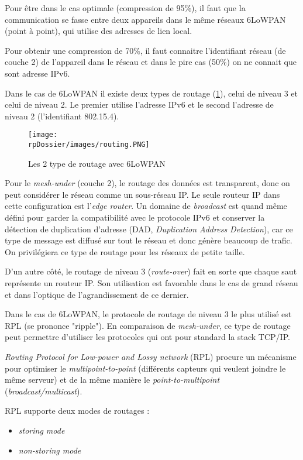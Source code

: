 Pour être dans le cas optimale (compression de 95\%), il faut que la communication se fasse entre deux appareils dans le même réseaux 6LoWPAN (point à point), qui utilise des adresses de lien local.

Pour obtenir une compression de 70\%, il faut connaitre l'identifiant réseau (de couche 2) de l'appareil dans le réseau et dans le pire cas (50\%) on ne connait que sont adresse IPv6.

Dans le cas de 6LoWPAN il existe deux types de routage (\cref{routing}), celui de niveau 3 et celui de niveau 2. Le premier utilise l'adresse IPv6 et le second l'adresse de niveau 2 (l'identifiant 802.15.4).

\begin{figure}[H]
\centering
\texttt{[image: \\rpDossier/images/routing.PNG]}
\caption{Les 2 type de routage avec 6LoWPAN}
\label{routing}
\end{figure}

Pour le  \textit{mesh-under} (couche 2), le routage des données est transparent, donc on peut considérer le réseau comme un sous-réseau IP. Le seule routeur IP dans cette configuration est l'\textit{edge router}. Un domaine de \textit{broadcast} est quand même défini pour garder la compatibilité avec le protocole IPv6 et  conserver la détection de duplication d'adresse (DAD, \textit{Duplication Address Detection}), car ce type de message est diffusé sur tout le réseau et donc génère beaucoup de trafic. On privilégiera ce type de routage pour les réseaux de petite taille.

D'un autre côté, le routage de niveau 3 (\textit{route-over}) fait en sorte que chaque saut représente un routeur IP. Son utilisation est favorable dans le cas de grand réseau et dans l'optique de l'agrandissement de ce dernier. 

Dans le cas de 6LoWPAN, le protocole de routage de niveau 3 le plus utilisé est RPL (se prononce "ripple"). En comparaison de \textit{mesh-under}, ce type de routage peut permettre d'utiliser les protocoles qui ont pour standard la stack TCP/IP.

\textit{Routing Protocol for Low-power and Lossy network} (RPL) procure un mécanisme pour optimiser le \textit{multipoint-to-point} (différents capteurs qui veulent joindre le même serveur) et de la même manière le \textit{point-to-multipoint} (\textit{broadcast/multicast}).

RPL supporte deux modes de routages : 
\begin{itemize}
\item \textit{storing mode}
\item \textit{non-storing mode}
\end{itemize}

